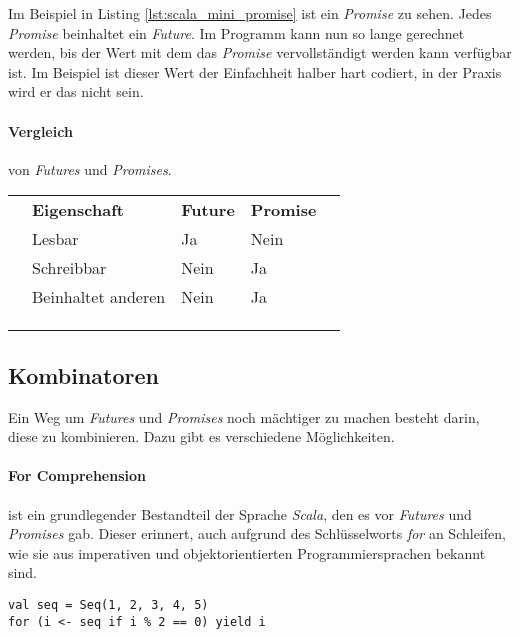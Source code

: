 Im Beispiel in Listing \ref{lst:scala_mini_promise} ist ein \emph{Promise} zu sehen.
Jedes \emph{Promise} beinhaltet ein \emph{Future}. Im Programm kann
nun so lange gerechnet werden, bis der Wert mit dem das \emph{Promise}
vervollständigt werden kann verfügbar ist. Im Beispiel ist dieser
Wert der Einfachheit halber hart codiert, in der Praxis wird er das
nicht sein.

\paragraph{Vergleich} von \emph{Futures} und \emph{Promises}.

\begin{table}[h]
\begin{tabular}{lllll}
 & \textbf{Eigenschaft} & \textbf{Future} & \textbf{Promise} &  \\
 & Lesbar & Ja & Nein &  \\
 & Schreibbar & Nein & Ja &  \\
 & Beinhaltet anderen & Nein & Ja &  \\
 &  &  &  &  \\
 &  &  &  &  \\
 &  &  &  & 
\end{tabular}
\end{table}

\subsection{Kombinatoren}

Ein Weg um \emph{Futures} und \emph{Promises} noch mächtiger
zu machen besteht darin, diese zu kombinieren. Dazu gibt es verschiedene
Möglichkeiten.

\paragraph{For Comprehension} ist ein grundlegender Bestandteil
der Sprache \emph{Scala}, den es vor \emph{Futures} und \emph{Promises}
gab. Dieser erinnert, auch aufgrund des Schlüsselworts \emph{for}
an Schleifen, wie sie aus imperativen und objektorientierten
Programmiersprachen bekannt sind.

\begin{lstlisting}[caption={For Comprehension},label={lst:forComprehension},captionpos=b]
val seq = Seq(1, 2, 3, 4, 5)
for (i <- seq if i % 2 == 0) yield i
\end{lstlisting}

